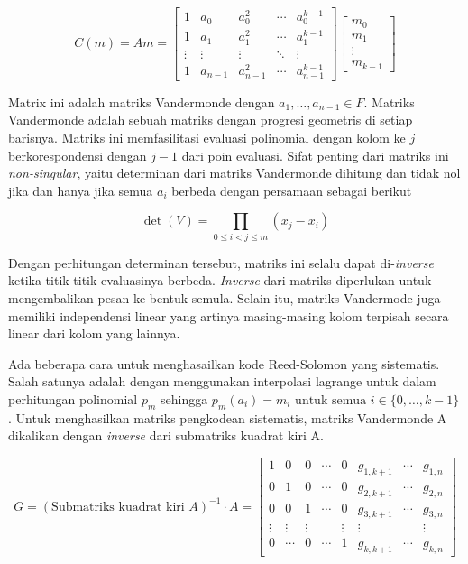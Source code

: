 \[
    C(m) = Am =
    \begin{bmatrix}
        1 & a_0 & a_0^2 & \cdots & a_0^{k-1} \\
        1 & a_1 & a_1^2 & \cdots & a_1^{k-1} \\
        \vdots & \vdots & \vdots & \ddots & \vdots \\
        1 & a_{n-1} & a_{n-1}^2 & \cdots & a_{n-1}^{k-1}
    \end{bmatrix}
    \begin{bmatrix}
        m_0 \\
        m_1 \\
        \vdots \\
        m_{k-1}
    \end{bmatrix}
\]

Matrix ini adalah matriks Vandermonde dengan $a_1,\ldots,a_{n-1} \in F$. Matriks Vandermonde adalah sebuah matriks dengan progresi geometris di setiap barisnya. Matriks ini memfasilitasi evaluasi polinomial dengan kolom ke $j$ berkorespondensi dengan $j - 1$ dari poin evaluasi. Sifat penting dari matriks ini \textit{non-singular}, yaitu determinan dari matriks Vandermonde dihitung dan tidak nol jika dan hanya jika semua $a_i$ berbeda dengan persamaan sebagai berikut

\[
    \det(V) = \prod_{0 \leq i < j \leq m} (x_j - x_i)
\]

Dengan perhitungan determinan tersebut, matriks ini selalu dapat di-\textit{inverse} ketika titik-titik evaluasinya berbeda. \textit{Inverse} dari matriks diperlukan untuk mengembalikan pesan ke bentuk semula. Selain itu, matriks Vandermode juga memiliki independensi linear yang artinya masing-masing kolom terpisah secara linear dari kolom yang lainnya.

Ada beberapa cara untuk menghasailkan kode Reed-Solomon yang sistematis. Salah satunya adalah dengan menggunakan interpolasi lagrange untuk dalam perhitungan polinomial $p_m$ sehingga $p_m(a_i) = m_i \text{ untuk semua } i \in \{0,\ldots,k-1\}$. Untuk menghasilkan matriks pengkodean sistematis, matriks Vandermonde A dikalikan dengan \textit{inverse} dari submatriks kuadrat kiri A.

\[
    G = {(\text{Submatriks kuadrat kiri } A)}^{-1} \cdot A = 
    \begin{bmatrix}
        1 & 0 & 0 & \cdots & 0 & g_{1,k+1} & \cdots & g_{1,n} \\
        0 & 1 & 0 & \cdots & 0 & g_{2,k+1} & \cdots & g_{2,n} \\
        0 & 0 & 1 & \cdots & 0 & g_{3,k+1} & \cdots & g_{3,n} \\
        \vdots & \vdots & \vdots & & \vdots & \vdots & & \vdots \\
        0 & \cdots & 0 & \cdots & 1 & g_{k,k+1} & \cdots & g_{k,n}
    \end{bmatrix}
\]

